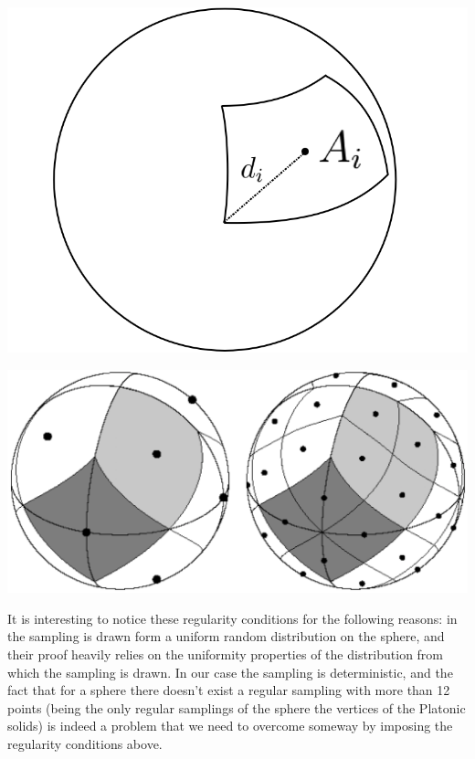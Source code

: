 \begin{minipage}{.5\textwidth}
	\centering
	\includegraphics[width=0.4\linewidth]{figs/chapter1/d_iA_i.png}
	\label{fig:Geometric characteristics of a patch}
\end{minipage}%
\begin{minipage}{.5\textwidth}
	\centering
	\includegraphics[width=0.7\linewidth]{figs/chapter1/Heal_Base.png}
	\label{fig:HEALPix equal areas patches}
	\vspace{0.5cm}
\end{minipage}

It is interesting to notice these regularity conditions for the following reasons: in \cite{Belkin:2005:TTF:2138147.2138189} the sampling is drawn form a uniform random distribution on the sphere, and their proof heavily relies on the uniformity properties of the distribution from which the sampling is drawn. In our case the sampling is deterministic, and the fact that for a sphere there doesn't exist a regular sampling with more than 12 points (being the only regular samplings of the sphere the vertices of the Platonic solids) is indeed a problem that we need to overcome someway by imposing the regularity conditions above. 

